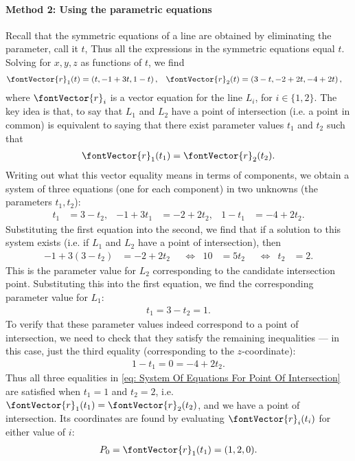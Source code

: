 {\paragraph{Method 2: Using the parametric equations}

Recall that the symmetric equations of a line are obtained by eliminating the parameter, call it $t$, Thus all the expressions in the symmetric equations equal $t$. Solving for $x,y,z$ as functions of $t$, we find
\begin{align*}
\fontVector{r}_{1}(t)
&=
\left(t,-1 + 3 t,1 - t\right),
&
\fontVector{r}_{2}(t)
&=
\left(3 - t,-2 + 2 t,-4 + 2 t\right),
\end{align*}
where $\fontVector{r}_{i}$ is a vector equation for the line $L_{i}$, for $i \in \{1,2\}$. The key idea is that, to say that $L_{1}$ and $L_{2}$ have a point of intersection (i.e. a point in common) is equivalent to saying that there exist parameter values $t_{1}$ and $t_{2}$ such that
\begin{align*}
\fontVector{r}_{1}(t_{1})
=
\fontVector{r}_{2}(t_{2}).
\end{align*}
Writing out what this vector equality means in terms of components, we obtain a system of three equations (one for each component) in two unknowns (the parameters $t_{1},t_{2}$):
\begin{align}
t_{1}
&=
3 - t_{2},
&
-1 + 3 t_{1}
&=
-2 + 2 t_{2},
&
1 - t_{1}
&=
-4 + 2 t_{2}.%
\label{eq: System Of Equations For Point Of Intersection}
\end{align}
Substituting the first equation into the second, we find that if a solution to this system exists (i.e. if $L_{1}$ and $L_{2}$ have a point of intersection), then
\begin{align*}
-1 + 3 (3 - t_{2})
&=
-2 + 2 t_{2}
&
&\Leftrightarrow
&
10
&=
5 t_{2}
&
&\Leftrightarrow
&
t_{2}
&=
2.
\end{align*}
This is the parameter value for $L_{2}$ corresponding to the candidate intersection point. Substituting this into the first equation, we find the corresponding parameter value for $L_{1}$:
\begin{align*}
t_{1}
=
3 - t_{2}
=
1.
\end{align*}
To verify that these parameter values indeed correspond to a point of intersection, we need to check that they satisfy the remaining inequalities --- in this case, just the third equality (corresponding to the $z$-coordinate):
\begin{align*}
1 - t_{1}
=
0
=
-4 + 2 t_{2}.
\end{align*}
Thus all three equalities in \eqref{eq: System Of Equations For Point Of Intersection} are satisfied when $t_{1} = 1$ and $t_{2} = 2$, i.e. $\fontVector{r}_{1}(t_{1}) = \fontVector{r}_{2}(t_{2})$, and we have a point of intersection. Its coordinates are found by evaluating $\fontVector{r}_{i}(t_{i})$ for either value of $i$:
\begin{align*}
P_{0}
=
\fontVector{r}_{1}(t_{1})
=
(1,2,0).
\end{align*}



}
